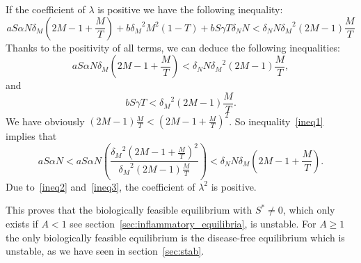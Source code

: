 \documentclass[a4paper, 12pt]{article}
\begin{document}
\noindent
If the coefficient of $\lambda$ is positive we have the following inequality:
\[
 a S \alpha N \delta_M (2M-1+\frac{M}{T})+ b{\delta_M}^2 M^2(1-T)+ b S\gamma T\delta_N N < \delta_N N {\delta_M}^2(2M-1)\frac{M}{T}
\]
Thanks to the positivity of all terms, we can deduce the following inequalities:
\begin{equation}
 a S \alpha N \delta_M (2M-1+\frac{M}{T}) < \delta_N N {\delta_M}^2(2M-1)\frac{M}{T},
\label{ineq1}
\end{equation}
and
\begin{equation}
 b S\gamma T < {\delta_M}^2(2M-1)\frac{M}{T}.
\label{ineq2}
\end{equation}
We have obviously $(2M-1)\frac{M}{T} < (2M-1 + \frac{M}{T})^2$. So inequality~\eqref{ineq1} implies that 
\begin{equation}\label{ineq3}
a S \alpha N < a S \alpha N\left(\frac{{\delta_M}^2 {(2M-1+\frac{M}{T}) }^2}{{\delta_M}^2(2M-1)\frac{M}{T}}\right)<\delta_N N \delta_M (2M-1+\frac{M}{T}).
\end{equation}
Due to~\eqref{ineq2} and~\eqref{ineq3}, the coefficient of $\lambda^2$ is positive.
\par\noindent
This proves that the biologically feasible equilibrium with $S^* \neq 0$, which only exists if $A<1$ see section~\ref{sec:inflammatory_equilibria},  is unstable.
For $A\geq 1$ the only biologically feasible equilibrium is the disease-free equilibrium which is unstable, as we have seen in section~\ref{sec:stab}.
\end{document}
